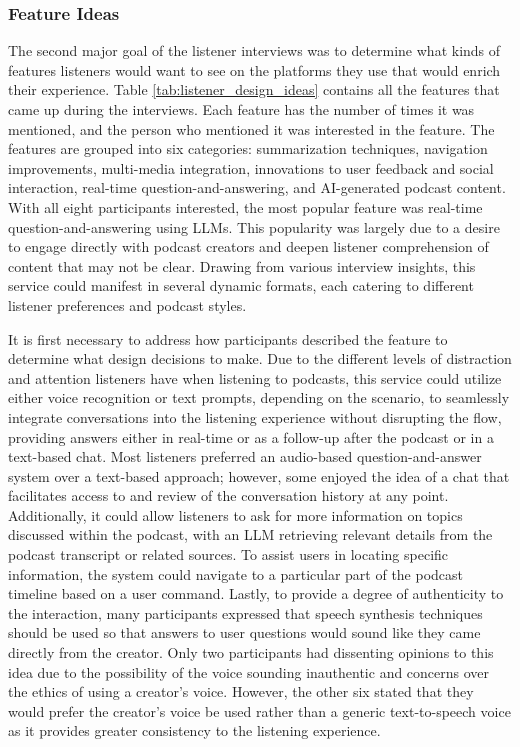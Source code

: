 \documentclass[12pt]{report}
\begin{document}
\begin{myfont}
        \subsubsection{Feature Ideas}
        \indent The second major goal of the listener interviews was to determine what kinds of features listeners would want to see on the platforms they use that would enrich their experience. Table \ref{tab:listener_design_ideas} contains all the features that came up during the interviews. Each feature has the number of times it was mentioned, and the person who mentioned it was interested in the feature. The features are grouped into six categories: summarization techniques, navigation improvements, multi-media integration, innovations to user feedback and social interaction, real-time question-and-answering, and AI-generated podcast content. With all eight participants interested, the most popular feature was real-time question-and-answering using LLMs. This popularity was largely due to a desire to engage directly with podcast creators and deepen listener comprehension of content that may not be clear. Drawing from various interview insights, this service could manifest in several dynamic formats, each catering to different listener preferences and podcast styles.
        
        \indent It is first necessary to address how participants described the feature to determine what design decisions to make. Due to the different levels of distraction and attention listeners have when listening to podcasts, this service could utilize either voice recognition or text prompts, depending on the scenario, to seamlessly integrate conversations into the listening experience without disrupting the flow, providing answers either in real-time or as a follow-up after the podcast or in a text-based chat. Most listeners preferred an audio-based question-and-answer system over a text-based approach; however, some enjoyed the idea of a chat that facilitates access to and review of the conversation history at any point. Additionally, it could allow listeners to ask for more information on topics discussed within the podcast, with an LLM retrieving relevant details from the podcast transcript or related sources. To assist users in locating specific information, the system could navigate to a particular part of the podcast timeline based on a user command. Lastly, to provide a degree of authenticity to the interaction, many participants expressed that speech synthesis techniques should be used so that answers to user questions would sound like they came directly from the creator. Only two participants had dissenting opinions to this idea due to the possibility of the voice sounding inauthentic and concerns over the ethics of using a creator's voice. However, the other six stated that they would prefer the creator's voice be used rather than a generic text-to-speech voice as it provides greater consistency to the listening experience.


\end{myfont}
\end{document}
